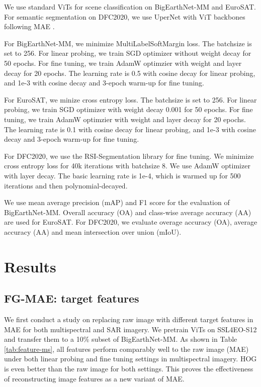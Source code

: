 \documentclass[lettersize,journal]{IEEEtran}
\begin{document}
\vspace{0.5em}
\hspace{0.3em}
We use standard ViTs for scene classification on BigEarthNet-MM and EuroSAT. For semantic segmentation on DFC2020, we use UperNet \cite{xiao2018unified} with ViT backbones following MAE \cite{he2022masked}. 

\vspace{0.5em}
\hspace{0.3em}
For BigEarthNet-MM, we minimize MultiLabelSoftMargin loss. The batchsize is set to 256. For linear probing, we train SGD optimizer without weight decay for 50 epochs. For fine tuning, we train AdamW optimzier with weight and layer decay for 20 epochs. The learning rate is 0.5 with cosine decay for linear probing, and 1e-3 with cosine decay and 3-epoch warm-up for fine tuning.

For EuroSAT, we minize cross entropy loss. The batchsize is set to 256. For linear probing, we train SGD optimizer with weight decay 0.001 for 50 epochs. For fine tuning, we train AdamW optimzier with weight and layer decay for 20 epochs. The learning rate is 0.1 with cosine decay for linear probing, and 1e-3 with cosine decay and 3-epoch warm-up for fine tuning.

For DFC2020, we use the RSI-Segmentation library \cite{xiong2022earthnets} for fine tuning. We minimize cross entropy loss for 40k iterations with batchsize 8. We use AdamW optimizer with layer decay. The basic learning rate is 1e-4, which is warmed up for 500 iterations and then polynomial-decayed. 

\vspace{0.5em}
\hspace{0.3em}
We use mean average precision (mAP) and F1 score for the evaluation of BigEarthNet-MM. Overall accuracy (OA) and class-wise average accuracy (AA) are used for EuroSAT. For DFC2020, we evaluate overage accuracy (OA), average accuracy (AA) and mean intersection over union (mIoU).

\section{Results}
\label{sec:results}

\subsection{FG-MAE: target features}
\label{subsec:feature-ablation}
We first conduct a study on replacing raw image with different target features in MAE for both multispectral and SAR imagery. We pretrain ViTs on SSL4EO-S12 and transfer them to a 10\% subset of BigEarthNet-MM. As shown in Table \ref{tab:feature-ms}, all features perform comparably well to the raw image (MAE) under both linear probing and fine tuning settings in multispectral imagery. HOG is even better than the raw image for both settings. This proves the effectiveness of reconstructing image features as a new variant of MAE. 
\end{document}
